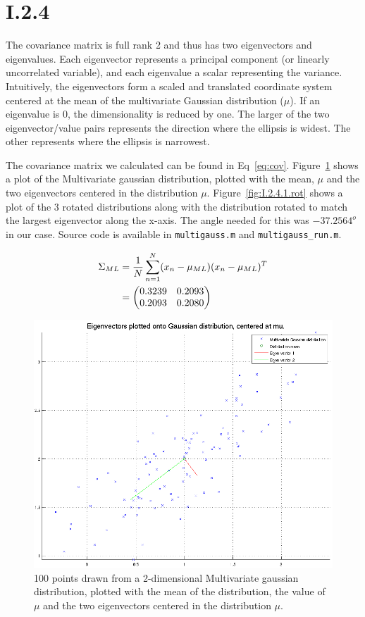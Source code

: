 \FloatBarrier
\section*{I.2.4}
The covariance matrix is full rank 2 and thus has two eigenvectors and
eigenvalues. Each eigenvector represents a principal component (or linearly
uncorrelated variable), and each eigenvalue a scalar representing the variance.
Intuitively, the eigenvectors form a scaled and translated coordinate system
centered at the mean of the multivariate Gaussian distribution ($\mu$). If an
eigenvalue is 0, the dimensionality is reduced by one. The larger of the two
eigenvector/value pairs represents the direction where the ellipsis is widest.
The other represents where the ellipsis is narrowest.

The covariance matrix we calculated can be found in
Eq~\ref{eq:cov}. Figure~\ref{fig:I.2.4.1} shows a plot of the Multivariate
gaussian distribution, plotted with the mean, $\mu$ and the two eigenvectors
centered in the distribution $\mu$. Figure~\ref{fig:I.2.4.1.rot} shows a plot of
the 3 rotated distributions along with the distribution rotated to match the
largest eigenvector along the x-axis. The angle needed for this was $-37.2564^o$
in our case. Source code is available in \texttt{multigauss.m} and \texttt{multigauss\_run.m}.

\begin{align}
	\Sigma_{ML} &= \frac{1}{N} \sum_{n=1}^N (x_n - \mu_{ML}) (x_n - \mu_{ML})^T \notag \\
	&= \begin{pmatrix}
		0.3239 & 0.2093 \\
		0.2093 & 0.2080
	\end{pmatrix} \label{eq:cov}
\end{align}

\begin{figure}[h!]
	\includegraphics[width=\textwidth]{img/multigausseigen}
	\caption{100 points drawn from a 2-dimensional Multivariate gaussian
          distribution, plotted with the mean of the distribution, the value of
          $\mu$ and the two eigenvectors centered in the distribution
          $\mu$. \label{fig:I.2.4.1}}
\end{figure}

